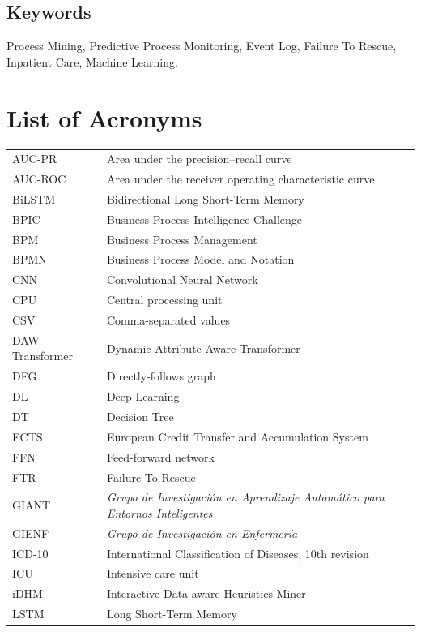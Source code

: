 \documentclass[a4paper,11pt,oneside]{book}
\begin{document}
\section*{Keywords}
Process Mining, Predictive Process Monitoring, Event Log, Failure To Rescue, Inpatient Care, Machine Learning.

\cleardoublepage
\pagestyle{plain}
\tableofcontents
\cleardoublepage
\listoffigures
\cleardoublepage
\listoftables
\cleardoublepage
\chapter*{List of Acronyms}
\begin{longtable}{@{}p{3.4cm}p{11.2cm}@{}}
AUC-PR & Area under the precision--recall curve \\
AUC-ROC & Area under the receiver operating characteristic curve \\
BiLSTM & Bidirectional Long Short-Term Memory \\
BPIC & Business Process Intelligence Challenge \\
BPM & Business Process Management \\
BPMN & Business Process Model and Notation \\
CNN & Convolutional Neural Network \\
CPU & Central processing unit \\
CSV & Comma-separated values \\
DAW-Transformer & Dynamic Attribute-Aware Transformer \\
DFG & Directly-follows graph \\
DL & Deep Learning \\
DT & Decision Tree \\
ECTS & European Credit Transfer and Accumulation System \\
FFN & Feed-forward network \\
FTR & Failure To Rescue \\
GIANT & \emph{Grupo de Investigaci\'on en Aprendizaje Autom\'atico para Entornos Inteligentes} \\
GIENF & \emph{Grupo de Investigaci\'on en Enfermer\'ia} \\
ICD-10 & International Classification of Diseases, 10th revision \\
ICU & Intensive care unit \\
iDHM & Interactive Data-aware Heuristics Miner \\
LSTM & Long Short-Term Memory \\

\end{longtable}
\end{document}
